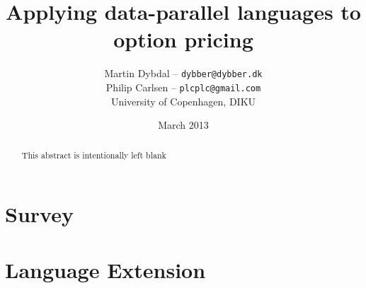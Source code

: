 \documentclass[10pt,a4paper,final,openright,twoside]{memoir}
\title{Applying data-parallel languages to option pricing}
\author{
  Martin Dybdal -- \texttt{dybber@dybber.dk} \\
  Philip Carlsen -- \texttt{plcplc@gmail.com}
\\
University of Copenhagen, DIKU}
\date{March 2013}
\begin{document}
\frontmatter






  \begin{abstract}
    This abstract is intentionally left blank
  \end{abstract}

\clearpage
\tableofcontents*

\mainmatter
{}




\part{Survey}
\label{part:survey}






\part{Language Extension}
\label{part:extensions}



\clearpage

{}
\printbibliography

\backmatter
\appendix

\end{document}
